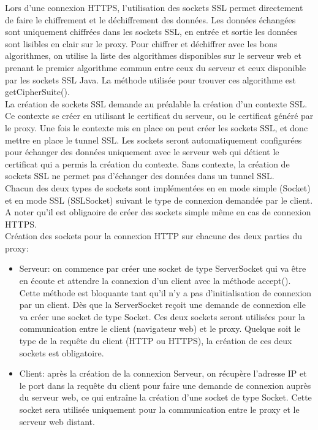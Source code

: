 \documentclass[a4paper,11pt,french]{report}
\begin{document}
Lors d'une connexion HTTPS, l'utilisation des sockets SSL permet directement de 
faire le chiffrement et le déchiffrement des données. Les données échangées sont 
uniquement chiffrées dans les sockets SSL, en entrée et sortie les données sont 
lisibles en clair sur le proxy.
Pour chiffrer et déchiffrer avec les bons algorithmes, on utilise la liste des 
algorithmes disponibles sur le serveur web et prenant le premier algorithme 
commun entre ceux du serveur et ceux disponible par les sockets SSL Java.
La méthode utilisée pour trouver ces algorithme est getCipherSuite().
~~\\

La création de sockets SSL demande au préalable la création d'un contexte SSL. 
Ce contexte se créer en utilisant le certificat du serveur, ou le certificat 
généré par le proxy. Une fois le contexte mis en place on peut créer les sockets 
SSL, et donc mettre en place le tunnel SSL. Les sockets seront automatiquement configurées pour échanger des données 
uniquement avec le serveur web qui détient le certificat qui a permis la 
création du contexte.
Sans contexte, la création de sockets SSL ne permet pas d'échanger des données 
dans un tunnel SSL.
~~\\

Chacun des deux types de sockets sont implémentées en en mode simple (Socket) et 
en mode SSL (SSLSocket) suivant le type de connexion demandée par le client. A 
noter qu'il est obligaoire de créer des sockets simple même en cas de connexion 
HTTPS.
~~\\

Création des sockets pour la connexion HTTP sur chacune des deux parties du proxy:
\begin{itemize}
  \item Serveur: on commence par créer une socket de type ServerSocket qui va 
  être en écoute et attendre la connexion d'un client avec la méthode accept(). 
  Cette méthode est bloquante tant qu'il n'y a pas d'initialisation de connexion 
  par un client. Dès que la ServerSocket reçoit une demande de connexion
  elle va créer une socket de type Socket. Ces deux sockets seront utilisées pour la communication entre le client (navigateur web) et le proxy.
  Quelque soit le type de la requête du client (HTTP ou HTTPS), la 
  création de ces deux sockets est obligatoire.~~\\
  
  \item Client: après la création de la connexion Serveur, on récupère 
  l'adresse IP et le port dans la requête du client pour faire une demande de 
  connexion auprès du serveur web, ce qui entraîne la création d'une socket de 
  type Socket. Cette socket sera utilisée uniquement pour la communication entre 
  le proxy et le serveur web distant. 
\end{itemize}
~~\\
\end{document}
